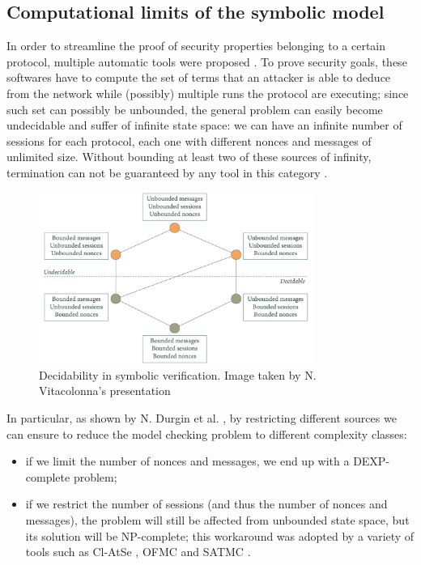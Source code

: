 \documentclass[fleqn,10pt]{SelfArx} %
\begin{document}
\subsection{Computational limits of the symbolic model}

In order to streamline the proof of security properties belonging to a certain protocol, multiple automatic tools were proposed \cite{SoK}. To prove security goals, these softwares have to compute the set of terms that an attacker is able to deduce from the network while (possibly) multiple runs the protocol are executing; since such set can possibly be unbounded, the general problem can easily become undecidable and suffer of infinite state space: we can have an infinite number of sessions for each protocol, each one with different nonces and messages of unlimited size. Without bounding at least two of these sources of infinity, termination can not be guaranteed by any tool in this category \cite{undecidability}.

\begin{figure}[t]
    \centering
    \captionsetup{justification=centering, margin=1cm}
    \includegraphics[width=0.8\textwidth]{Figures/undecidability.png}
    \caption{Decidability in symbolic verification. Image taken by N. Vitacolonna's presentation \cite{PresentazioneVitacolonna}}
\end{figure}


In particular, as shown by N. Durgin et al. \cite{ComplexityOfBoundedSecurity}, by restricting different sources we can ensure to reduce the model checking problem to different complexity classes:

\begin{itemize}
    \item if we limit the number of nonces and messages, we end up with a DEXP-complete problem;
    \item if we restrict the number of sessions (and thus the number of nonces and messages), the problem will still be affected from unbounded state space, but its solution will be NP-complete; this workaround was adopted by a variety of tools such as Cl-AtSe \cite{clAtse}, OFMC \cite{ofmc} and SATMC \cite{satmc}.
\end{itemize}
\end{document}
